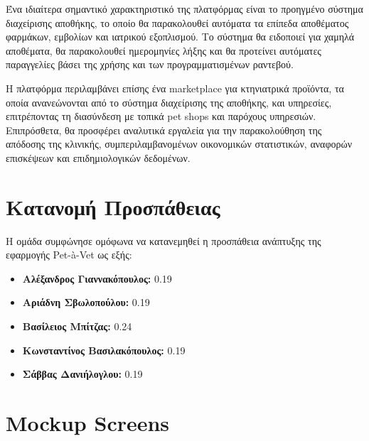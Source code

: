 \documentclass[12pt,a4paper,twoside]{book}
\begin{document}
Ένα ιδιαίτερα σημαντικό χαρακτηριστικό της πλατφόρμας είναι το προηγμένο σύστημα διαχείρισης αποθήκης, το οποίο θα παρακολουθεί αυτόματα τα επίπεδα αποθέματος φαρμάκων, εμβολίων και ιατρικού εξοπλισμού. Το σύστημα θα ειδοποιεί για χαμηλά αποθέματα, θα παρακολουθεί ημερομηνίες λήξης και θα προτείνει αυτόματες παραγγελίες βάσει της χρήσης και των προγραμματισμένων ραντεβού. %

Η πλατφόρμα περιλαμβάνει επίσης ένα marketplace για κτηνιατρικά προϊόντα, τα οποία ανανεώνονται από το σύστημα διαχείρισης της αποθήκης, και υπηρεσίες, επιτρέποντας τη διασύνδεση με τοπικά pet shops και παρόχους υπηρεσιών. Επιπρόσθετα, θα προσφέρει αναλυτικά εργαλεία για την παρακολούθηση της απόδοσης της κλινικής, συμπεριλαμβανομένων οικονομικών στατιστικών, αναφορών επισκέψεων και επιδημιολογικών δεδομένων. %

\section{Κατανομή Προσπάθειας}

Η ομάδα συμφώνησε ομόφωνα να κατανεμηθεί η προσπάθεια ανάπτυξης της εφαρμογής Pet-à-Vet ως εξής: %
\begin{itemize}
    \item \textbf{Αλέξανδρος Γιαννακόπουλος:} 0.19 %
    \item \textbf{Αριάδνη Σβωλοπούλου:} 0.19 %
    \item \textbf{Βασίλειος Μπίτζας:} 0.24
    \item \textbf{Κωνσταντίνος Βασιλακόπουλος:} 0.19
    \item \textbf{Σάββας Δανιήλογλου:} 0.19
\end{itemize}


\section{Mockup Screens}
\end{document}
